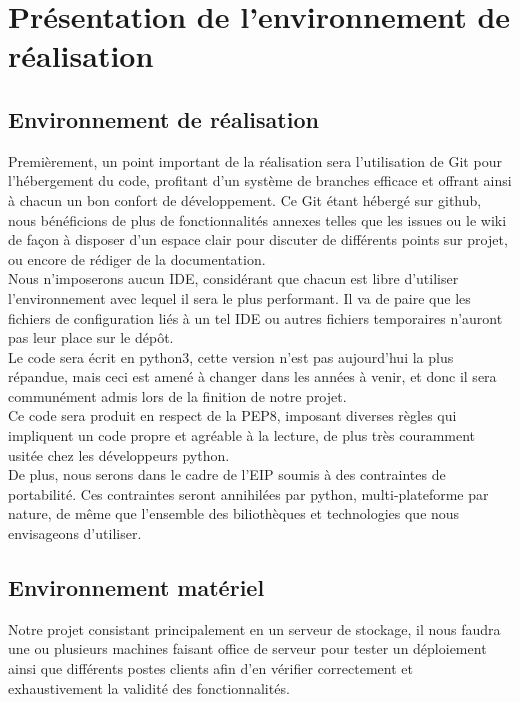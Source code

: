\documentclass[12pt]{report}
\begin{document}
\chapter{Présentation de l'environnement de réalisation}
\thispagestyle{EIP} %
\section{Environnement de réalisation}
Premièrement, un point important de la réalisation sera l'utilisation de Git pour l'hébergement du code, profitant d'un système de branches efficace et offrant ainsi à chacun un bon confort de développement. Ce Git étant hébergé sur github, nous bénéficions de plus de fonctionnalités annexes telles que les issues ou le wiki de façon à disposer d'un espace clair pour discuter de différents points sur projet, ou encore de rédiger de la documentation.\\

Nous n'imposerons aucun IDE, considérant que chacun est libre d'utiliser l'environnement avec lequel il sera le plus performant. Il va de paire que les fichiers de configuration liés à un tel IDE ou autres fichiers temporaires n'auront pas leur place sur le dépôt.\\

Le code sera écrit en python3, cette version n'est pas aujourd'hui la plus répandue, mais ceci est amené à changer dans les années à venir, et donc il sera communément admis lors de la finition de notre projet.\\
Ce code sera produit en respect de la PEP8, imposant diverses règles qui impliquent un code propre et agréable à la lecture, de plus très couramment usitée chez les développeurs python.\\

De plus, nous serons dans le cadre de l'EIP soumis à des contraintes de portabilité. Ces contraintes seront annihilées par python, multi-plateforme par nature, de même que l'ensemble des biliothèques et technologies que nous envisageons d'utiliser.

\section{Environnement matériel}
Notre projet consistant principalement en un serveur de stockage, il nous faudra une ou plusieurs machines faisant office de serveur pour tester un déploiement ainsi que différents postes clients afin d'en vérifier correctement et exhaustivement la validité des fonctionnalités.\\
\end{document}
